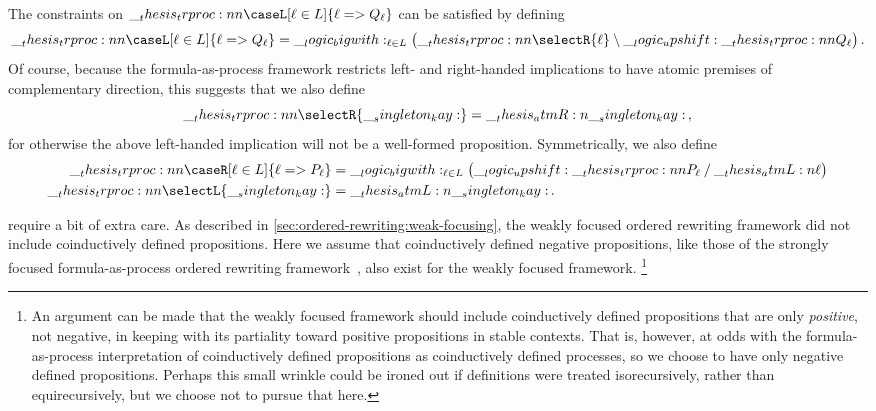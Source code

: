 The constraints on $\trproc{\caseL[\ell \in L]{\ell => Q_{\ell}}}$ can be satisfied by defining
\begin{gather*}
  \trproc{\caseL[\ell \in L]{\ell => Q_{\ell}}}
    = \bigwith_{\ell \in L}\bigl(\trproc{\selectR{\ell}} \limp \up \trproc{Q_{\ell}}\bigr)
  \,.
\end{gather*}
Of course, because the formula-as-process framework restricts left- and right-handed implications to have atomic premises of complementary direction, this suggests that we also define
\begin{equation*}
  \trproc{\selectR{\kay}} = \atmR{\kay}
  \,,
\end{equation*}
for otherwise the above left-handed implication will not be a well-formed proposition.
Symmetrically, we also define 
\begin{align*}
  \trproc{\caseR[\ell \in L]{\ell => P_{\ell}}} &= \bigwith_{\ell \in L}\bigl(\up \trproc{P_{\ell}} \pmir \atmL{\ell}\bigr) \\
  \trproc{\selectL{\kay}} &= \atmL{\kay}
  \,.
\end{align*}

 require a bit of extra care.
As described in \cref{sec:ordered-rewriting:weak-focusing}, the weakly focused ordered rewriting framework did not include coinductively defined propositions.
Here we assume that coinductively defined negative propositions, like those of the strongly focused formula-as-process ordered rewriting framework~, also exist for the weakly focused framework.%
\footnote{An argument can be made that the weakly focused framework should include coinductively defined propositions that are only \emph{positive}, not negative, in keeping with its partiality toward positive propositions in stable contexts.
  That is, however, at odds with the formula-as-process interpretation of coinductively defined propositions as coinductively defined processes, so we choose to have only negative defined propositions.
  Perhaps this small wrinkle could be ironed out if definitions were treated iso\-re\-cur\-sive\-ly, rather than equi\-re\-cur\-sive\-ly, but we choose not to pursue that here.}

